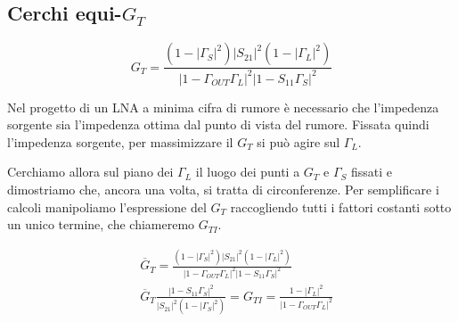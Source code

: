 

\subsection{Cerchi equi-$G_T$}

$$G_T = \frac{(1-|\Gamma_S|^2) |S_{21}|^2 (1-|\Gamma_L|^2)}{|1-\Gamma_{OUT}\Gamma_{L}|^2|1-S_{11}\Gamma_{S}|^2}$$

Nel progetto di un LNA a minima cifra di rumore è necessario che l'impedenza sorgente sia l'impedenza ottima dal punto di vista del rumore. Fissata quindi l'impedenza sorgente, per massimizzare il $G_T$ si può agire sul $\Gamma_L$.

%	

Cerchiamo allora sul piano dei $\Gamma_L$ il luogo dei punti a $G_T$ e $\Gamma_S$ fissati e dimostriamo che, ancora una volta, si tratta di circonferenze.
Per semplificare i calcoli manipoliamo l'espressione del $G_T$ raccogliendo tutti i fattori costanti sotto un unico termine, che chiameremo $G_{TI}$.

\begin{align*}
&\overline{G}_T  = \frac{(1-|\Gamma_S|^2) |S_{21}|^2 (1-|\Gamma_L|^2)}{|1-\Gamma_{OUT}\Gamma_{L}|^2|1-S_{11}\Gamma_{S}|^2}\\
&\overline{G}_T \frac{|1-S_{11}\Gamma_{S}|^2}
{|S_{21}|^2 (1-|\Gamma_S|^2)} = G_{TI} =  \frac{1-|\Gamma_L|^2}{|1-\Gamma_{OUT}\Gamma_{L}|^2}
\end{align*}

